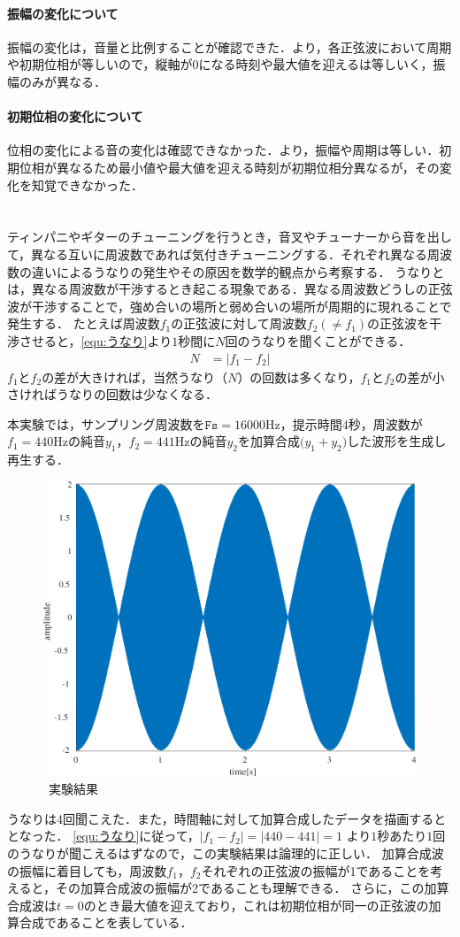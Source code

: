 \paragraph{振幅の変化について} 振幅の変化は，音量と比例することが確認できた．より，各正弦波において周期や初期位相が等しいので，縦軸が\(0\)になる時刻や最大値を迎えるは等しいく，振幅のみが異なる．
\paragraph{初期位相の変化について} 位相の変化による音の変化は確認できなかった．より，振幅や周期は等しい．初期位相が異なるため最小値や最大値を迎える時刻が初期位相分異なるが，その変化を知覚できなかった．
\section{\kadaiac}\label{sec:\kadaiac}
\purpose
ティンパニやギターのチューニングを行うとき，音叉やチューナーから音を出して，異なる互いに周波数であれば気付きチューニングする．それぞれ異なる周波数の違いによるうなりの発生やその原因を数学的観点から考察する．
\method
うなりとは，異なる周波数が干渉するとき起こる現象である．異なる周波数どうしの正弦波が干渉することで，強め合いの場所と弱め合いの場所が周期的に現れることで発生する．
たとえば周波数\(f_1\)の正弦波に対して周波数\(f_2(\neq f_1)\)の正弦波を干渉させると，\eqref{equ:うなり}より\(1\)秒間に\(N\)回のうなりを聞くことができる．
\begin{align}
    N & = \big|f_1-f_2\big|\label{equ:うなり}
\end{align}
\(f_1\)と\(f_2\)の差が大きければ，当然うなり（\(N\)）の回数は多くなり，\(f_1\)と\(f_2\)の差が小さければうなりの回数は少なくなる．\par
本実験では，サンプリング周波数を\(\texttt{Fs}=16000\textrm{Hz}\)，提示時間\(4\)秒，周波数が\(f_1=440\textrm{Hz}\)の純音\(y_1\)，\(f_2=441\textrm{Hz}\)の純音\(y_2\)を加算合成\(\big(y_1+y_2\big)\)した波形を生成し再生する．\\
\begin{figure}
    \centering
    \includegraphics[keepaspectratio,width=.3\textwidth]{../../Figures/01_03.pdf}
    \caption{\kadaiac\ 実験結果}
    \label{fig:\kadaiac_実験結果}
\end{figure}
\result
うなりは4回聞こえた．また，時間軸に対して加算合成したデータを描画するととなった．
\consideration \eqref{equ:うなり}に従って，\(\big|f_1-f_2\big|= \big|440-441\big|=1\)
より\(1\)秒あたり\(1\)回のうなりが聞こえるはずなので，この実験結果は論理的に正しい．
加算合成波の振幅に着目しても，周波数\(f_1\)，\(f_2\)それぞれの正弦波の振幅が1であることを考えると，その加算合成波の振幅が2であることも理解できる．
さらに，この加算合成波は\(t=0\)のとき最大値を迎えており，これは初期位相が同一の正弦波の加算合成であることを表している．

